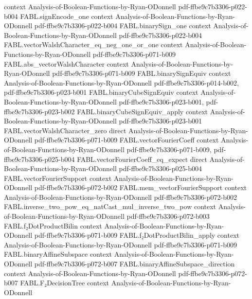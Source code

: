 \begin{theorem}
  {context}
  {Analysis-of-Boolean-Functions-by-Ryan-ODonnell}
  {pdf-ffbe9c7b3306-p022-b004}
\proofstep
  {FABL.signEncode_one}
  {context}
  {Analysis-of-Boolean-Functions-by-Ryan-ODonnell}
  {pdf-ffbe9c7b3306-p022-b004}
\proofstep
  {FABL.binarySign_one}
  {context}
  {Analysis-of-Boolean-Functions-by-Ryan-ODonnell}
  {pdf-ffbe9c7b3306-p022-b004}
\proofstep
  {FABL.vectorWalshCharacter_eq_neg_one_or_one}
  {context}
  {Analysis-of-Boolean-Functions-by-Ryan-ODonnell}
  {pdf-ffbe9c7b3306-p071-b009}
\proofstep
  {FABL.abs_vectorWalshCharacter}
  {context}
  {Analysis-of-Boolean-Functions-by-Ryan-ODonnell}
  {pdf-ffbe9c7b3306-p071-b009}
\proofstep
  {FABL.binarySignEquiv}
  {context}
  {Analysis-of-Boolean-Functions-by-Ryan-ODonnell}
  {pdf-ffbe9c7b3306-p014-b002,
    pdf-ffbe9c7b3306-p023-b001}
\proofstep
  {FABL.binaryCubeSignEquiv}
  {context}
  {Analysis-of-Boolean-Functions-by-Ryan-ODonnell}
  {pdf-ffbe9c7b3306-p023-b001,
    pdf-ffbe9c7b3306-p023-b002}
\proofstep
  {FABL.binaryCubeSignEquiv_apply}
  {context}
  {Analysis-of-Boolean-Functions-by-Ryan-ODonnell}
  {pdf-ffbe9c7b3306-p023-b001}
\proofstep
  {FABL.vectorWalshCharacter_zero}
  {direct}
  {Analysis-of-Boolean-Functions-by-Ryan-ODonnell}
  {pdf-ffbe9c7b3306-p071-b009}
\proofstep
  {FABL.vectorFourierCoeff}
  {context}
  {Analysis-of-Boolean-Functions-by-Ryan-ODonnell}
  {pdf-ffbe9c7b3306-p071-b009,
    pdf-ffbe9c7b3306-p025-b004}
\proofstep
  {FABL.vectorFourierCoeff_eq_expect}
  {direct}
  {Analysis-of-Boolean-Functions-by-Ryan-ODonnell}
  {pdf-ffbe9c7b3306-p025-b004}
\proofstep
  {FABL.vectorFourierSupport}
  {context}
  {Analysis-of-Boolean-Functions-by-Ryan-ODonnell}
  {pdf-ffbe9c7b3306-p072-b002}
\proofstep
  {FABL.mem_vectorFourierSupport}
  {context}
  {Analysis-of-Boolean-Functions-by-Ryan-ODonnell}
  {pdf-ffbe9c7b3306-p072-b002}
\proofstep
  {FABL.inverse_two_pow_eq_natCast_mul_inverse_two_pow}
  {context}
  {Analysis-of-Boolean-Functions-by-Ryan-ODonnell}
  {pdf-ffbe9c7b3306-p072-b003}
\proofstep
  {FABL.f₂DotProductBilin}
  {context}
  {Analysis-of-Boolean-Functions-by-Ryan-ODonnell}
  {pdf-ffbe9c7b3306-p071-b009}
\proofstep
  {FABL.f₂DotProductBilin_apply}
  {context}
  {Analysis-of-Boolean-Functions-by-Ryan-ODonnell}
  {pdf-ffbe9c7b3306-p071-b009}
\proofstep
  {FABL.binaryAffineSubspace}
  {context}
  {Analysis-of-Boolean-Functions-by-Ryan-ODonnell}
  {pdf-ffbe9c7b3306-p072-b007}
\proofstep
  {FABL.binaryAffineSubspace_direction}
  {context}
  {Analysis-of-Boolean-Functions-by-Ryan-ODonnell}
  {pdf-ffbe9c7b3306-p072-b007}
\proofstep
  {FABL.F₂DecisionTree}
  {context}
  {Analysis-of-Boolean-Functions-by-Ryan-ODonnell}

\end{theorem}
